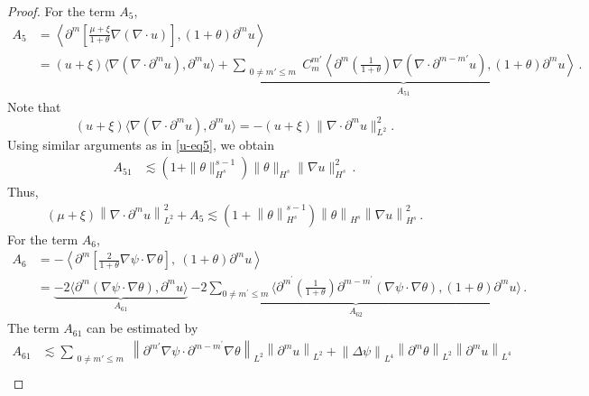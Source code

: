 \documentclass[reqno,11pt]{amsart}
\numberwithin{equation}{section}
\def\p{\partial}
\begin{document}
\begin{proof}
For the term $A_5$,
\begin{equation*}
\begin{aligned}
A_5&= \left\langle \partial^m \left[ \frac{\mu + \xi}{1+\theta} \nabla (\nabla \cdot u) \right], (1+\theta)\partial^m u \right\rangle\\&
=(u+\xi)\langle \nabla(\nabla\cdot \p^m u),\p^m u \rangle +\underset{A_{51}}{\underbrace{ \sum_{\substack{0 \neq m' \leq m}} C_m^{m'} \left\langle \partial^{m} \left( \frac{1}{1+\theta} \right) \nabla \left( \nabla \cdot \partial^{m - m'} u \right), (1+\theta)\partial^m u \right\rangle}}
\,.
\end{aligned}
\end{equation*}
Note that
$$(u+\xi)\langle \nabla(\nabla\cdot \p^m u),\p^m u   \rangle=-(u+\xi)\|\nabla\cdot\p^mu\|^2_{L^2}.$$
Using similar arguments as in \eqref{u-eq5}, we obtain
\begin{equation*}
\begin{aligned}
A_{51}&\lesssim(1+\|\theta\|^{s-1}_{H^s})\|\theta\|_{H^s}\|\nabla u\|^2_{H^s}
\,.
\end{aligned}
\end{equation*}
Thus, 
\begin{equation}\label{u-eq7}
\begin{aligned}
 (\mu + \xi) \left\| \nabla \cdot \partial^m u \right\|_{L^2}^2 + A_5 \lesssim \left( 1 + \left\| \theta \right\|_{H^s}^{s-1} \right) \left\| \theta \right\|_{H^s} \left\| \nabla u \right\|_{H^s}^2 \,.
\end{aligned}
\end{equation}
For the term $A_6$,
\begin{equation*}
\begin{aligned}
A_6&=- \left\langle \partial^m \left[ \frac{2}{1+\theta} \nabla \psi \cdot \nabla \theta \right],\ (1+\theta) \partial^m u \right\rangle\\&
=\underset{A_{61}}{\underbrace{-2\langle\p^m(\nabla\psi\cdot\nabla\theta),\p^m u \rangle }} \ \underset{A_{62}}{ \underbrace{ -2 \sum_{0\neq m^\prime\leq m} \langle     \p^{m^\prime}(\frac{1}{1+\theta})\p^{m-m^\prime}(\nabla \psi\cdot\nabla\theta),(1+\theta)\p^m u\rangle}}
 \,.
\end{aligned}
\end{equation*}
The term $A_{61}$ can be estimated by
\begin{equation*}
\begin{aligned}
A_{61}&\lesssim \sum_{\substack{0 \neq m' \leq m}} \left\| \partial^{m'} \nabla \psi \cdot \p^{m-m^\prime}\nabla \theta \right\|_{L^2} \left\| \partial^m u \right\|_{L^2} + \left\| \Delta \psi \right\|_{L^4} \left\| \p^m \theta \right\|_{L^2} \left\| \partial^m u \right\|_{L^4} \\

\end{aligned}
\end{equation*}
\end{proof}
\end{document}
